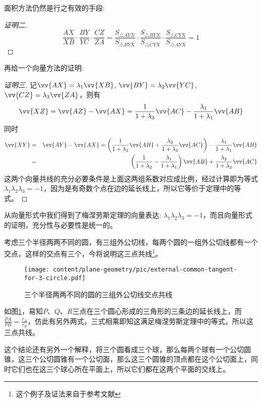 面积方法仍然是行之有效的手段:
\begin{proof}[证明二]
  \begin{equation*}
    \frac{AX}{XB} \cdot \frac{BY}{YC} \cdot \frac{CZ}{ZA} =
    \frac{S_{\triangle AYX}}{S_{\triangle BYX}} \cdot
    \frac{S_{\triangle BYX}}{S_{\triangle CYX}} \cdot
    \frac{S_{\triangle CYX}}{S_{\triangle AYX}} = 1
  \end{equation*}
\end{proof}

再给一个向量方法的证明:
\begin{proof}[证明三]
  记$\vv{AX}=\lambda_1\vv{XB}$, $\vv{BY}=\lambda_2\vv{YC}$, $\vv{CZ}=\lambda_3\vv{ZA}$，则有
  \begin{equation*}
    \vv{XZ} = \vv{AZ}-\vv{AX}=\frac{1}{1+\lambda_3}\vv{AC}-\frac{\lambda_1}{1+\lambda_1}\vv{AB}
  \end{equation*}
  同时
  \begin{eqnarray*}
    \vv{XY} &=& \vv{AY} - \vv{AX} = \left( \frac{1}{1+\lambda_2}\vv{AB}+\frac{\lambda_2}{1+\lambda_2}\vv{AC} \right) - \frac{\lambda_1}{1+\lambda_1}\vv{AB} \\
    &=& \left( \frac{1}{1+\lambda_2}-\frac{\lambda_1}{1+\lambda_1} \right)\vv{AB}+\frac{\lambda_2}{1+\lambda_2}\vv{AC} 
  \end{eqnarray*}
这两个向量共线的充分必要条件是上面这两组系数对应成比例，经过计算即为等式$\lambda_1\lambda_2\lambda_3=-1$，因为是有奇数个点在边的延长线上，所以它等价于定理中的等式。
\end{proof}

从向量形式中我们得到了梅涅劳斯定理的向量表达: $\lambda_1\lambda_2\lambda_3=-1$，而且向量形式的证明，充分性与必要性是统一的。

\begin{example}
  \label{example:external-common-tangent-for-3-circle}
  考虑三个半径两两不同的圆，有三组外公切线，每两个圆的一组外公切线都有一个交点，这样的交点有三个，今将说明这三点共线\footnote{这个例子及证法来自于参考文献\cite{kuing-problem-book}}。
 
\begin{figure}[htbp]
\centering
\texttt{[image: content/plane-geometry/pic/external-common-tangent-for-3-circle.pdf]}
\caption{三个半径两两不同的圆的三组外公切线交点共线}
\label{fig:external-common-tangent-for-3-circle}
\end{figure}

如图\ref{fig:external-common-tangent-for-3-circle}，易知$P$、$Q$、$R$三点在三个圆心形成的三角形的三条边的延长线上，而$\frac{PA}{PB}=\frac{r_A}{r_B}$，仿此有另外两式，三式相乘即知这满足梅涅劳斯定理中的等式，所以这三点共线。

这个结论还有另外一个解释，将三个圆看成三个球，那么每两个球有一个公切圆锥，这三个公切圆锥有一个公切面，那么这三个圆锥的顶点都在这个公切面上，同时它们也在这三个球心所在平面上，所以它们都在这两个平面的交线上。
  
\end{example}

